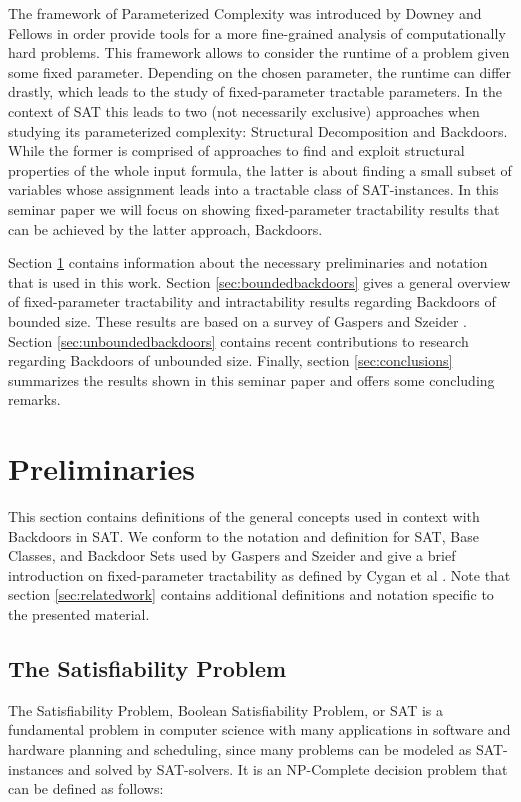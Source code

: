 \documentclass[11pt,a4paper]{article}
\makeatletter
\newcommand{\problemtitle}[1]{\gdef\@problemtitle{#1}}%
\newcommand{\probleminput}[1]{\gdef\@probleminput{#1}}%
\newcommand{\problemquestion}[1]{\gdef\@problemquestion{#1}}%
\theoremstyle{definition}
\theoremstyle{proposition}
\makeatother
\begin{document}
The framework of Parameterized Complexity was introduced by Downey and Fellows \cite{downeyFellows} in order provide tools for a more fine-grained analysis of computationally hard problems. This framework allows to consider the runtime of a problem given some fixed parameter. Depending on the chosen parameter, the runtime can differ drastly, which leads to the study of fixed-parameter tractable parameters. In the context of SAT this leads to two (not necessarily exclusive) approaches when studying its parameterized complexity: Structural Decomposition and Backdoors. While the former is comprised of approaches to find and exploit structural properties of the whole input formula, the latter is about finding a small subset of variables whose assignment leads into a tractable class of SAT-instances. In this seminar paper we will focus on showing fixed-parameter tractability results that can be achieved by the latter approach, Backdoors. 

Section \ref{sec:preliminaries} contains information about the necessary preliminaries and notation that is used in this work. Section \ref{sec:boundedbackdoors} gives a general overview of fixed-parameter tractability and intractability results regarding Backdoors of bounded size. These results are based on a survey of Gaspers and Szeider \cite{Gaspers2012}. Section \ref{sec:unboundedbackdoors} contains recent contributions to research regarding Backdoors of unbounded size. Finally, section \ref{sec:conclusions} summarizes the results shown in this seminar paper and offers some concluding remarks. 

\section{Preliminaries}
\label{sec:preliminaries}
This section contains definitions of the general concepts used in context with Backdoors in SAT. We conform to the notation and definition for SAT, Base Classes, and Backdoor Sets used by Gaspers and Szeider \cite{Gaspers2012} and give a brief introduction on fixed-parameter tractability as defined by Cygan et al \cite{Cygan2015}. Note that section \ref{sec:relatedwork} contains additional definitions and notation specific to the presented material. 
\subsection{The Satisfiability Problem}
The Satisfiability Problem, Boolean Satisfiability Problem, or SAT is a fundamental problem in computer science with many applications in software and hardware planning and scheduling, since many problems can be modeled as SAT-instances and solved by SAT-solvers. It is an NP-Complete decision problem that can be defined as follows: 
\begin{csproblem}
\problemtitle{SAT}
\probleminput{A propositional logic formula $F$ in conjunctive normal form (CNF) over propositional variables $X = \{x_1, x_2, ... , x_n\}$}
\problemquestion{Is there a truth assignment $\tau: X \to \{0,1\}$ (or $\tau \in 2^X$) such that $F[\tau]$ evaluates to $1$?}
\end{csproblem}
\end{document}
